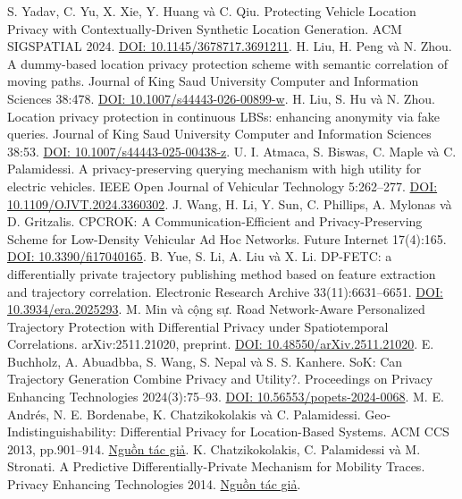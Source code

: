  S. Yadav, C. Yu, X. Xie, Y. Huang và C. Qiu. Protecting Vehicle Location Privacy with Contextually-Driven Synthetic Location Generation. ACM SIGSPATIAL 2024. \href{https://arxiv.org/abs/2409.09495}{DOI: 10.1145/3678717.3691211}.
 H. Liu, H. Peng và N. Zhou. A dummy-based location privacy protection scheme with semantic correlation of moving paths. Journal of King Saud University Computer and Information Sciences 38:478. \href{https://link.springer.com/article/10.1007/s44443-026-00899-w}{DOI: 10.1007/s44443-026-00899-w}.
 H. Liu, S. Hu và N. Zhou. Location privacy protection in continuous LBSs: enhancing anonymity via fake queries. Journal of King Saud University Computer and Information Sciences 38:53. \href{https://link.springer.com/article/10.1007/s44443-025-00438-z}{DOI: 10.1007/s44443-025-00438-z}.
 U. I. Atmaca, S. Biswas, C. Maple và C. Palamidessi. A privacy-preserving querying mechanism with high utility for electric vehicles. IEEE Open Journal of Vehicular Technology 5:262--277. \href{https://wrap.warwick.ac.uk/id/eprint/183198/}{DOI: 10.1109/OJVT.2024.3360302}.
 J. Wang, H. Li, Y. Sun, C. Phillips, A. Mylonas và D. Gritzalis. CPCROK: A Communication-Efficient and Privacy-Preserving Scheme for Low-Density Vehicular Ad Hoc Networks. Future Internet 17(4):165. \href{https://uhra.herts.ac.uk/id/eprint/25705/}{DOI: 10.3390/fi17040165}.
 B. Yue, S. Li, A. Liu và X. Li. DP-FETC: a differentially private trajectory publishing method based on feature extraction and trajectory correlation. Electronic Research Archive 33(11):6631--6651. \href{https://www.aimspress.com/article/doi/10.3934/era.2025293}{DOI: 10.3934/era.2025293}.
 M. Min và cộng sự. Road Network-Aware Personalized Trajectory Protection with Differential Privacy under Spatiotemporal Correlations. arXiv:2511.21020, preprint. \href{https://arxiv.org/abs/2511.21020}{DOI: 10.48550/arXiv.2511.21020}.
 E. Buchholz, A. Abuadbba, S. Wang, S. Nepal và S. S. Kanhere. SoK: Can Trajectory Generation Combine Privacy and Utility?. Proceedings on Privacy Enhancing Technologies 2024(3):75--93. \href{https://petsymposium.org/popets/2024/popets-2024-0068.pdf}{DOI: 10.56553/popets-2024-0068}.
 M. E. Andrés, N. E. Bordenabe, K. Chatzikokolakis và C. Palamidessi. Geo-Indistinguishability: Differential Privacy for Location-Based Systems. ACM CCS 2013, pp.901--914. \href{https://arxiv.org/abs/1212.1984}{Nguồn tác giả}.
 K. Chatzikokolakis, C. Palamidessi và M. Stronati. A Predictive Differentially-Private Mechanism for Mobility Traces. Privacy Enhancing Technologies 2014. \href{https://petsymposium.org/2014/papers/Chatzikokolakis.pdf}{Nguồn tác giả}.
